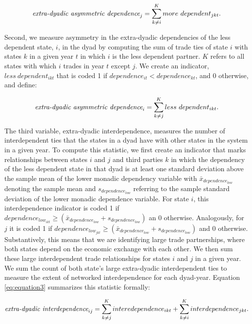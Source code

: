 \documentclass[12pt]{article}
\theoremstyle{hypothesis}
\begin{document}
\begin{equation}
\text{\it{extra-dyadic asymmetric dependence}}_{j} = \sum_{k \neq i}^{K} more~dependent_{jkt}.
\end{equation}

Second, we measure asymmetry in the extra-dyadic dependencies of the less dependent state, $i$, in the dyad by computing the sum of trade ties of state $i$ with states $k$ in a given year $t$ in which $i$ is the less dependent partner. $K$ refers to all states with which $i$ trades in year $t$ except $j$. We create an indicator, $less~dependent_{ikt}$ that is coded 1 if $dependence_{it} < dependence_{kt}$, and 0 otherwise, and define:

\begin{equation}
\text{\it{extra-dyadic asymmetric dependence}}_{i} =  \sum_{k \neq j}^{K} less~dependent_{ikt}.
\end{equation}

The third variable, extra-dyadic interdependence, measures the number of interdependent ties that the states in a dyad have with other states in the system in a given year. To compute this statistic, we first create an indicator that marks relationships between states $i$ and $j$ and third parties $k$ in which the dependency of the less dependent state in that dyad is at least one standard deviation above the sample mean of the lower monadic dependency variable with $\bar{x}_{dependence_{low}}$ denoting the sample mean and $s_{dependence_{low}}$ referring to the sample standard deviation of the lower monadic dependence variable. For state $i$, this interdependence indicator is coded 1 if $dependence_{low_{ikt}} \geq \left(\bar{x}_{dependence_{low}}+s_{dependence_{low}}\right)$ an 0 otherwise. Analogously, for $j$ it is coded 1 if $dependence_{low_{jkt}} \geq \left(\bar{x}_{dependence_{low}}+s_{dependence_{low}}\right)$ and 0 otherwise. Substantively, this means that we are identifying large trade partnerships, where both states depend on the economic exchange with each other. We then sum these large interdependent trade relationships for states $i$ and $j$ in a given year. We sum the count of both state's large extra-dyadic interdependent ties to measure the extent of networked interdependence for each dyad-year. Equation \ref{eq:equation3} summarizes this statistic formally:

\begin{multline}
\label{eq:equation3}
\text{\it{extra-dyadic interdependence}}_{ij} = \sum_{k \neq j}^{K} interedependence_{ikt} +  \sum_{k \neq i}^{K} interdependence_{jkt}.
\end{multline}
\end{document}
